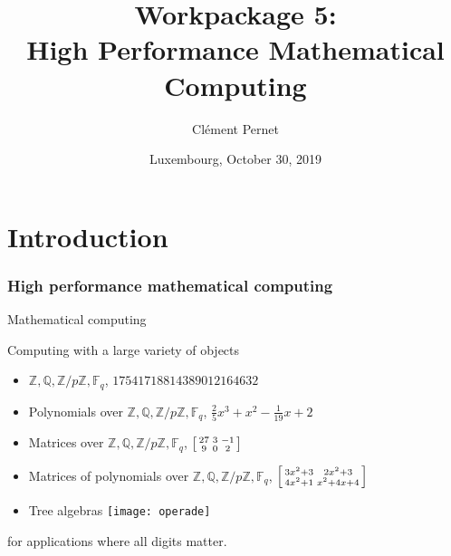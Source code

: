 \documentclass{beamer}
\title[WP 5]{Workpackage 5:\\ High Performance Mathematical Computing}
\author[C. Pernet]{Clément Pernet}
\date[Luxembourg, 2019-10-30]{Luxembourg, October 30, 2019}
\institute[ODK Final project review]{Final OpenDreamKit Project review}
\newenvironment{smatrix}{\left[\begin{smallmatrix}}{\end{smallmatrix}\right]}
\newcommand{\Z}{\ensuremath{\mathbb{Z}\xspace}}
\newcommand{\Q}{\ensuremath{\mathbb{Q}\xspace}}
\newcommand{\F}{\ensuremath{\mathbb{F}\xspace}}
\begin{document}
\maketitle

\section*{Introduction}

\begin{frame}
  \frametitle{High performance mathematical computing}
  \begin{block}{Mathematical computing}

    Computing with a large variety of objects
        \begin{itemize}[<+->]
        \item $\Z, \Q, \Z/p\Z, \F_q$, \hfill {\color{blue} $17541718814389012164632$}
        \item Polynomials over $\Z, \Q, \Z/p\Z, \F_q$, \hfill {\color{blue} $\frac{2}{5} x^{3} + x^{2} - \frac{1}{19} x + 2$}
        \item Matrices over $\Z, \Q, \Z/p\Z, \F_q$, \hfill
           {\color{blue} $\begin{smatrix} 27&3&-1\\ 9&0& 2 \end{smatrix} $}
        \item Matrices of polynomials over $\Z, \Q, \Z/p\Z, \F_q$, \hfill
          {\color{blue} $ \begin{smatrix}
            3 x^{2} + 3 & 2 x^{2} + 3 \\4 x^{2} + 1 & x^{2} + 4 x + 4
          \end{smatrix}$}
        \item Tree algebras \hfill
      \texttt{[image: operade]}
        \end{itemize}

        for applications where all digits matter.

  \end{block}
\end{frame}
\end{document}
